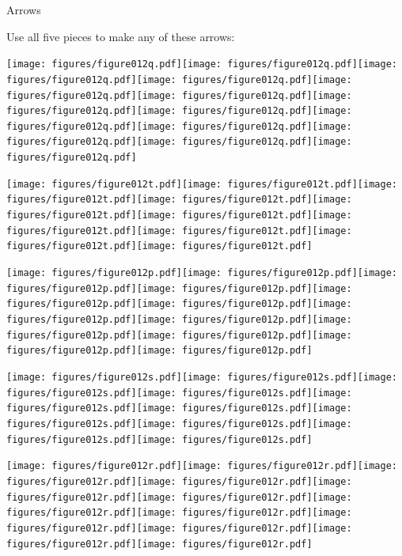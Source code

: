 \documentclass[14pt]{beamer}
\begin{document}
    \begin{frame}{Arrows}
        \begin{center}
            Use all five pieces to make any of these arrows:

            \bigskip\bigskip

            \texttt{[image: figures/figure012q.pdf]}\texttt{[image: figures/figure012q.pdf]}\texttt{[image: figures/figure012q.pdf]}\texttt{[image: figures/figure012q.pdf]}\texttt{[image: figures/figure012q.pdf]}\texttt{[image: figures/figure012q.pdf]}\texttt{[image: figures/figure012q.pdf]}\texttt{[image: figures/figure012q.pdf]}\texttt{[image: figures/figure012q.pdf]}\texttt{[image: figures/figure012q.pdf]}\texttt{[image: figures/figure012q.pdf]}\texttt{[image: figures/figure012q.pdf]}\texttt{[image: figures/figure012q.pdf]}

            \bigskip\bigskip

            \texttt{[image: figures/figure012t.pdf]}\;\;\texttt{[image: figures/figure012t.pdf]}\;\;\texttt{[image: figures/figure012t.pdf]}\;\;\texttt{[image: figures/figure012t.pdf]}\;\;\texttt{[image: figures/figure012t.pdf]}\;\;\texttt{[image: figures/figure012t.pdf]}\;\;\texttt{[image: figures/figure012t.pdf]}\;\;\texttt{[image: figures/figure012t.pdf]}\;\;\texttt{[image: figures/figure012t.pdf]}\;\;\texttt{[image: figures/figure012t.pdf]}

            \bigskip\bigskip

            \texttt{[image: figures/figure012p.pdf]}\texttt{[image: figures/figure012p.pdf]}\texttt{[image: figures/figure012p.pdf]}\texttt{[image: figures/figure012p.pdf]}\texttt{[image: figures/figure012p.pdf]}\texttt{[image: figures/figure012p.pdf]}\texttt{[image: figures/figure012p.pdf]}\texttt{[image: figures/figure012p.pdf]}\texttt{[image: figures/figure012p.pdf]}\texttt{[image: figures/figure012p.pdf]}\texttt{[image: figures/figure012p.pdf]}\texttt{[image: figures/figure012p.pdf]}

            \bigskip\bigskip

            \texttt{[image: figures/figure012s.pdf]}\;\;\texttt{[image: figures/figure012s.pdf]}\;\;\texttt{[image: figures/figure012s.pdf]}\;\;\texttt{[image: figures/figure012s.pdf]}\;\;\texttt{[image: figures/figure012s.pdf]}\;\;\texttt{[image: figures/figure012s.pdf]}\;\;\texttt{[image: figures/figure012s.pdf]}\;\;\texttt{[image: figures/figure012s.pdf]}\;\;\texttt{[image: figures/figure012s.pdf]}\;\;\texttt{[image: figures/figure012s.pdf]}

            \bigskip\bigskip

            \texttt{[image: figures/figure012r.pdf]}\;\;\texttt{[image: figures/figure012r.pdf]}\;\;\texttt{[image: figures/figure012r.pdf]}\;\;\texttt{[image: figures/figure012r.pdf]}\;\;\texttt{[image: figures/figure012r.pdf]}\;\;\texttt{[image: figures/figure012r.pdf]}\;\;\texttt{[image: figures/figure012r.pdf]}\;\;\texttt{[image: figures/figure012r.pdf]}\;\;\texttt{[image: figures/figure012r.pdf]}\;\;\texttt{[image: figures/figure012r.pdf]}\;\;\texttt{[image: figures/figure012r.pdf]}\;\;\texttt{[image: figures/figure012r.pdf]}
        \end{center}
    \end{frame}
\end{document}

